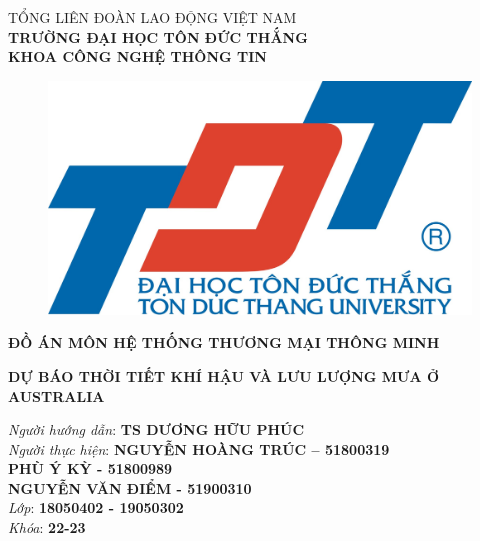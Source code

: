 \documentclass{article}
\begin{document}
\begin{center}
	\fontsize{14}{20}\selectfont
	\textsc{TỔNG LIÊN ĐOÀN LAO ĐỘNG VIỆT NAM\\ 
	\textbf{TRƯỜNG ĐẠI HỌC TÔN ĐỨC THẮNG\\} 
	\textbf{KHOA CÔNG NGHỆ THÔNG TIN}}
	
	\vspace{0.8cm}
	\begin{figure}[htp]
	\begin{center}
		\includegraphics[scale=0.04]{images/logo.png}
	\end{center}
	\end{figure}

	\fontsize{16}{20}\selectfont\textbf{ĐỒ ÁN MÔN HỆ THỐNG THƯƠNG MẠI THÔNG MINH\\}
	
	\vspace{2cm}
	\fontsize{24}{20}\selectfont\textbf{DỰ BÁO THỜI TIẾT KHÍ HẬU VÀ LƯU LƯỢNG MƯA Ở AUSTRALIA}
\end{center}

\vspace{1cm}
\begin{flushright}
	\fontsize{14}{20}\selectfont
	\textit{Người hướng dẫn}: \textbf{TS DƯƠNG HỮU PHÚC}\\
	\textit{Người thực hiện}: \textbf{NGUYỄN HOÀNG TRÚC – 51800319}\\
	\textbf{PHÙ Ý KỲ - 51800989}\\
	\textbf{NGUYỄN VĂN ĐIỂM - 51900310}\\
	\textit{Lớp}: \textbf{18050402 - 19050302}\\
	\textit{Khóa}: \textbf{22-23}\\
\end{flushright}
\end{document}
